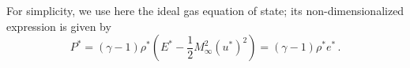 \documentclass[review,10pt]{elsarticle}
\newcommand{\tcr}[1]{\textcolor{red}{#1}}
\newcommand{\tcb}[1]{\textcolor{blue}{#1}}
\begin{document}
For simplicity, we use here the ideal gas equation of state; its non-dimensionalized expression is given by
%
\begin{equation}
\label{eq:euler_eq2_eos}
P^* = \left( \gamma-1 \right) \rho^*\left(  E^* -\frac{1}{2} M_\infty^2 (u^*)^2 \right) = \left( \gamma-1 \right) \rho^* e^* \, .
\end{equation}


\end{document}
